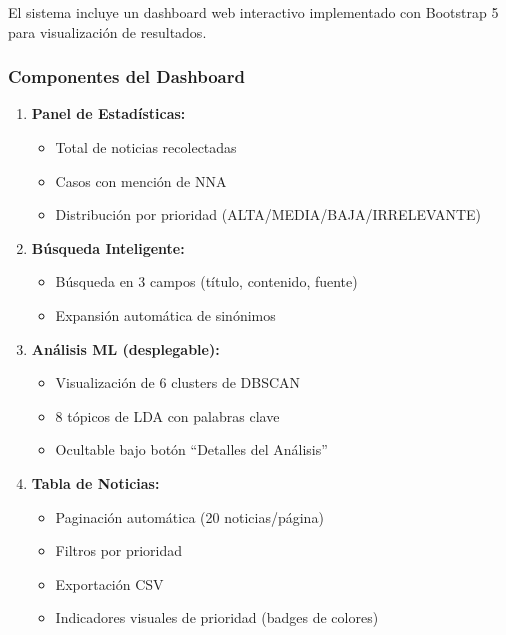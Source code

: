 El sistema incluye un dashboard web interactivo implementado con Bootstrap 5 para visualización de resultados.

\subsubsection{Componentes del Dashboard}
\label{subsubsec:componentes_dashboard}

\begin{enumerate}
    \item \textbf{Panel de Estadísticas:}
    \begin{itemize}
        \item Total de noticias recolectadas
        \item Casos con mención de NNA
        \item Distribución por prioridad (ALTA/MEDIA/BAJA/IRRELEVANTE)
    \end{itemize}
    
    \item \textbf{Búsqueda Inteligente:}
    \begin{itemize}
        \item Búsqueda en 3 campos (título, contenido, fuente)
        \item Expansión automática de sinónimos
    \end{itemize}
    
    \item \textbf{Análisis ML (desplegable):}
    \begin{itemize}
        \item Visualización de 6 clusters de DBSCAN
        \item 8 tópicos de LDA con palabras clave
        \item Ocultable bajo botón ``Detalles del Análisis''
    \end{itemize}
    
    \item \textbf{Tabla de Noticias:}
    \begin{itemize}
        \item Paginación automática (20 noticias/página)
        \item Filtros por prioridad
        \item Exportación CSV
        \item Indicadores visuales de prioridad (badges de colores)
    \end{itemize}
\end{enumerate}

